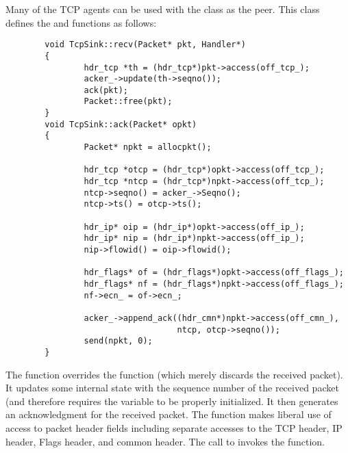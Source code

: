 Many of the TCP agents can be used with the  class
as the peer.
This class defines the  and  functions as follows:
\begin{small}
\begin{verbatim}
        void TcpSink::recv(Packet* pkt, Handler*)
        {
                hdr_tcp *th = (hdr_tcp*)pkt->access(off_tcp_);
                acker_->update(th->seqno());
                ack(pkt);
                Packet::free(pkt);
        }
        void TcpSink::ack(Packet* opkt)
        {
                Packet* npkt = allocpkt();
        
                hdr_tcp *otcp = (hdr_tcp*)opkt->access(off_tcp_);
                hdr_tcp *ntcp = (hdr_tcp*)npkt->access(off_tcp_);
                ntcp->seqno() = acker_->Seqno();
                ntcp->ts() = otcp->ts();
        
                hdr_ip* oip = (hdr_ip*)opkt->access(off_ip_);
                hdr_ip* nip = (hdr_ip*)npkt->access(off_ip_);
                nip->flowid() = oip->flowid();
        
                hdr_flags* of = (hdr_flags*)opkt->access(off_flags_);
                hdr_flags* nf = (hdr_flags*)npkt->access(off_flags_);
                nf->ecn_ = of->ecn_;
        
                acker_->append_ack((hdr_cmn*)npkt->access(off_cmn_),
                                   ntcp, otcp->seqno());
                send(npkt, 0);
        }
\end{verbatim}
\end{small}
The  function overrides the  function
(which merely discards the received packet).
It updates some internal state with the sequence number of the
received packet (and therefore requires the  variable
to be properly initialized.
It then generates an acknowledgment for the received packet.
The  function makes liberal use of access to packet header
fields including separate accesses to the TCP header, IP header,
Flags header, and common header.
The call to  invokes the  function.

\subsection{}

